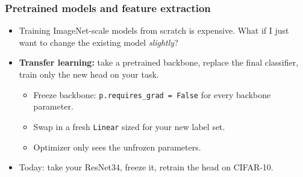 \begin{frame}
\frametitle{Pretrained models and feature extraction}
\begin{itemize}
    \item Training ImageNet-scale models from scratch is expensive. What if I just want to change the existing model \textit{slightly}?
    \pause
    \item \textbf{Transfer learning:} take a pretrained backbone, replace the
    final classifier, train only the new head on your task.
    \begin{itemize}
        \item Freeze backbone: \texttt{p.requires\_grad = False} for every
        backbone parameter.
        \pause
        \item Swap in a fresh \texttt{Linear} sized for your new label set.
        \pause
        \item Optimizer only sees the unfrozen parameters.
    \end{itemize}
    \pause
    \item Today: take your ResNet34, freeze it, retrain the head on CIFAR-10.
\end{itemize}
\end{frame}

